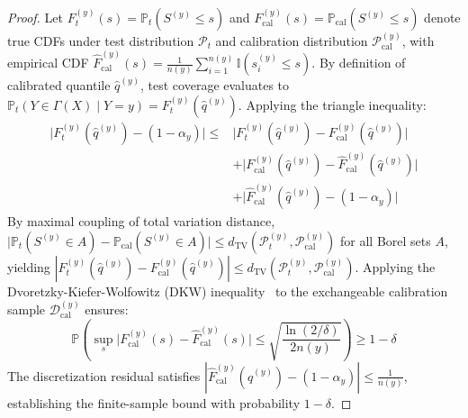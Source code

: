 \begin{proof}
Let $F_t^{(y)}(s) = \mathbb{P}_t(S^{(y)} \le s)$ and $F_{\text{cal}}^{(y)}(s) = \mathbb{P}_{\text{cal}}(S^{(y)} \le s)$ denote true CDFs under test distribution $\mathcal{P}_t$ and calibration distribution $\mathcal{P}_{\text{cal}}^{(y)}$, with empirical CDF $\hat{F}_{\text{cal}}^{(y)}(s) = \frac{1}{n(y)} \sum_{i=1}^{n(y)} \mathbb{I}(s_i^{(y)} \le s)$. By definition of calibrated quantile $\hat{q}^{(y)}$, test coverage evaluates to $\mathbb{P}_t(Y \in \Gamma(X) \mid Y=y) = F_t^{(y)}(\hat{q}^{(y)})$. Applying the triangle inequality:
\begin{equation}
\begin{aligned}
\big| F_t^{(y)}(\hat{q}^{(y)}) - (1 - \alpha_y) \big| \le & \big| F_t^{(y)}(\hat{q}^{(y)}) - F_{\text{cal}}^{(y)}(\hat{q}^{(y)}) \big| \\
& + \big| F_{\text{cal}}^{(y)}(\hat{q}^{(y)}) - \hat{F}_{\text{cal}}^{(y)}(\hat{q}^{(y)}) \big| \\
& + \big| \hat{F}_{\text{cal}}^{(y)}(\hat{q}^{(y)}) - (1 - \alpha_y) \big|
\end{aligned}
\end{equation}
By maximal coupling of total variation distance, $\big| \mathbb{P}_t(S^{(y)} \in A) - \mathbb{P}_{\text{cal}}(S^{(y)} \in A) \big| \le d_{\mathrm{TV}}(\mathcal{P}_t^{(y)}, \mathcal{P}_{\text{cal}}^{(y)})$ for all Borel sets $A$, yielding $|F_t^{(y)}(\hat{q}^{(y)}) - F_{\text{cal}}^{(y)}(\hat{q}^{(y)})| \le d_{\mathrm{TV}}(\mathcal{P}_t^{(y)}, \mathcal{P}_{\text{cal}}^{(y)})$. Applying the Dvoretzky-Kiefer-Wolfowitz (DKW) inequality~\cite{massart1990tight} to the exchangeable calibration sample $\mathcal{D}_{\text{cal}}^{(y)}$ ensures:
\begin{equation}
\mathbb{P}\left( \sup_{s} \big| F_{\text{cal}}^{(y)}(s) - \hat{F}_{\text{cal}}^{(y)}(s) \big| \le \sqrt{\frac{\ln(2/\delta)}{2 n(y)}} \right) \ge 1 - \delta
\end{equation}
The discretization residual satisfies $|\hat{F}_{\text{cal}}^{(y)}(\hat{q}^{(y)}) - (1 - \alpha_y)| \le \frac{1}{n(y)}$, establishing the finite-sample bound with probability $1 - \delta$.
\end{proof}

